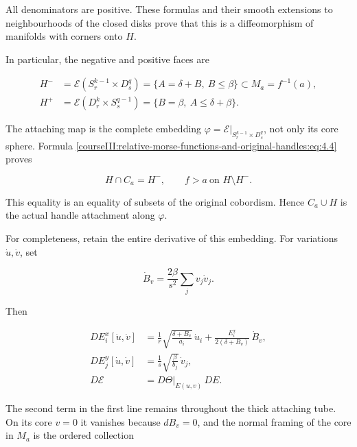 All denominators are positive. These formulas and their smooth extensions to neighbourhoods of the closed disks prove that this is a diffeomorphism of manifolds with corners onto \(H\).

In particular, the negative and positive faces are

\begin{equation}
\begin{aligned}
H^-&=\mathcal E(S_r^{k-1}\times D_s^q)
     =\{A=\delta+B,\ B\leq\beta\}\subset M_a=f^{-1}(a),\\
H^+&=\mathcal E(D_r^k\times S_s^{q-1})
     =\{B=\beta,\ A\leq\delta+\beta\}.
\end{aligned}
\label{courseIII:relative-morse-functions-and-original-handles:eq:4.6}
\end{equation}

The attaching map is the complete embedding
\(\varphi=\mathcal E|_{S_r^{k-1}\times D_s^q}\), not only its core sphere. Formula \eqref{courseIII:relative-morse-functions-and-original-handles:eq:4.4} proves

\begin{equation}
H\cap C_a=H^-,\qquad f>a\ \text{on }H\setminus H^-.
\label{courseIII:relative-morse-functions-and-original-handles:eq:4.7}
\end{equation}

This equality is an equality of subsets of the original cobordism. Hence \(C_a\cup H\) is the actual handle attachment along \(\varphi\).

For completeness, retain the entire derivative of this embedding. For variations \(\dot u,\dot v\), set

\[
\dot B_v=\frac{2\beta}{s^2}\sum_jv_j\dot v_j.
\]

Then

\begin{equation}
\begin{aligned}
DE_i^x[\dot u,\dot v]
&=\frac1r\sqrt{\frac{\delta+B_v}{a_i}}\,\dot u_i
  +\frac{E_i^x}{2(\delta+B_v)}\,\dot B_v,\\
DE_j^y[\dot u,\dot v]
&=\frac1s\sqrt{\frac{\beta}{b_j}}\,\dot v_j,\\
D\mathcal E&=D\Theta|_{E(u,v)}\,DE.
\end{aligned}
\label{courseIII:relative-morse-functions-and-original-handles:eq:4.8}
\end{equation}

The second term in the first line remains throughout the thick attaching tube. On its core \(v=0\) it vanishes because \(dB_v=0\), and the normal framing of the core in \(M_a\) is the ordered collection

